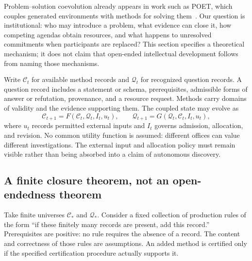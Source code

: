 \documentclass[11pt,letterpaper]{article}
\theoremstyle{plain}
\theoremstyle{definition}
\theoremstyle{remark}
\begin{document}
Problem--solution coevolution already appears in work such as POET, which couples generated environments with methods for solving them~\cite{poet}. Our question is institutional: who may introduce a problem, what evidence can close it, how competing agendas obtain resources, and what happens to unresolved commitments when participants are replaced? This section specifies a theoretical mechanism; it does not claim that open-ended intellectual development follows from naming those mechanisms.

Write $\mathcal C_t$ for available method records and $\mathcal Q_t$ for recognized question records. A question record includes a statement or schema, prerequisites, admissible forms of answer or refutation, provenance, and a resource request. Methods carry domains of validity and the evidence supporting them. The coupled state may evolve as
\[
\mathcal C_{t+1}=F(\mathcal C_t,\mathcal Q_t,I_t,u_t),\qquad
\mathcal Q_{t+1}=G(\mathcal Q_t,\mathcal C_t,I_t,u_t),
\]
where $u_t$ records permitted external inputs and $I_t$ governs admission, allocation, and revision. No common utility function is assumed: different offices can value different investigations. The external input and allocation policy must remain visible rather than being absorbed into a claim of autonomous discovery.

\subsection{A finite closure theorem, not an open-endedness theorem}
Take finite universes $\mathcal C_*$ and $\mathcal Q_*$. Consider a fixed collection of production rules of the form ``if these finitely many records are present, add this record.'' Prerequisites are positive: no rule requires the absence of a record. The content and correctness of those rules are assumptions. An added method is certified only if the specified certification procedure actually supports it.
\end{document}
